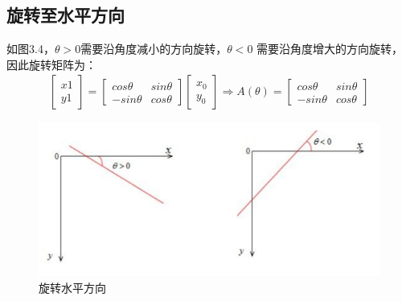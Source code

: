 \subsection{旋转至水平方向}
如图3.4，$\theta>0$需要沿角度减小的方向旋转，$\theta<0$ 需要沿角度增大的方向旋转，因此旋转矩阵为：
\begin{equation}
\begin{aligned}
\left[
\begin{matrix}
x1\\
y1
\end{matrix}
\right]
=
\left[
\begin{matrix}
cos\theta & sin\theta\\
-sin\theta & cos\theta 
\end{matrix}
\right]
\left[
\begin{matrix}
x_0\\
y_0 
\end{matrix}
\right]
\Rightarrow
A(\theta)=
\left[
\begin{matrix}
cos\theta & sin\theta\\
-sin\theta & cos\theta 
\end{matrix}
\right] 
\end{aligned}
\end{equation}
\begin{figure}[h]
	\centering
	\includegraphics[scale=0.5]{figures/8.png}
	\caption{旋转水平方向}
	\label{fig:2}
\end{figure}


